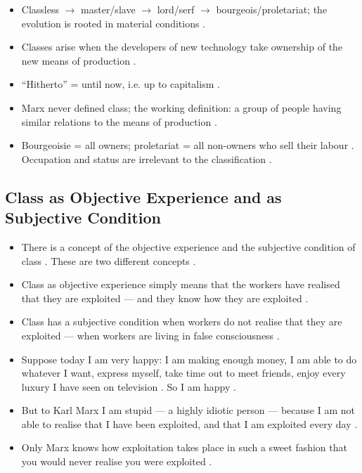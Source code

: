 \begin{QuickRevision}
\begin{itemize}
    \item Classless $\rightarrow$ master/slave $\rightarrow$ lord/serf $\rightarrow$ bourgeois/proletariat; the evolution is rooted in material conditions .
    \item Classes arise when the developers of new technology take ownership of the new means of production .
    \item ``Hitherto'' = until now, i.e. up to capitalism .
    \item Marx never defined class; the working definition: a group of people having similar relations to the means of production .
    \item Bourgeoisie = all owners; proletariat = all non-owners who sell their labour . Occupation and status are irrelevant to the classification .
\end{itemize}
\end{QuickRevision}

\subsection{Class as Objective Experience and as Subjective Condition}
\begin{itemize}
    \item There is a concept of the objective experience and the subjective condition of class . These are two different concepts .
    \item Class as objective experience simply means that the workers have realised that they are exploited --- and they know how they are exploited .
    \item Class has a subjective condition when workers do not realise that they are exploited --- when workers are living in false consciousness .
\end{itemize}

\begin{ExampleBox}
\begin{itemize}
    \item Suppose today I am very happy: I am making enough money, I am able to do whatever I want, express myself, take time out to meet friends, enjoy every luxury I have seen on television . So I am happy .
    \item But to Karl Marx I am stupid --- a highly idiotic person --- because I am not able to realise that I have been exploited, and that I am exploited every day .
    \item Only Marx knows how exploitation takes place in such a sweet fashion that you would never realise you were exploited .
\end{itemize}
\end{ExampleBox}

